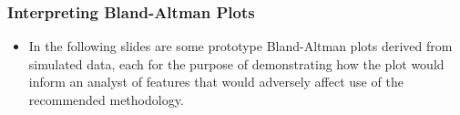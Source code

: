 \documentclass[compress]{beamer}        %
\begin{document}
\begin{frame}
\frametitle{Interpreting Bland-Altman Plots}
\begin{itemize}

\item In the following slides are some prototype Bland-Altman plots
derived from simulated data, each for the purpose of demonstrating
how the plot would inform an analyst of features that would
adversely affect use of the recommended methodology.
\end{itemize}

\end{frame}
\end{document}

